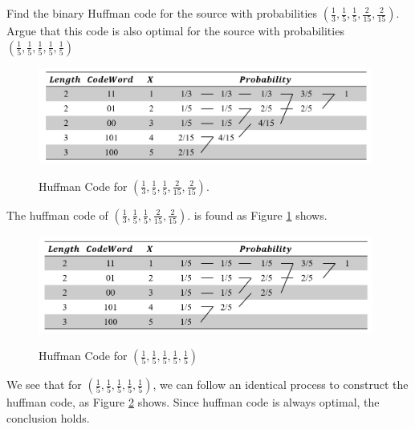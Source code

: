 \begin{exercise}{Find the binary Huffman code for the source with probabilities $\left(\frac{1}{3}, \frac{1}{5}, \frac{1}{5}, \frac{2}{15}, \frac{2}{15}\right) .$ Argue that this code is also optimal for the source with probabilities $\left(\frac{1}{5}, \frac{1}{5}, \frac{1}{5}, \frac{1}{5}, \frac{1}{5}\right)$}
  \begin{solution}
    \begin{figure}[H]
      \caption{Huffman Code for $\left(\frac{1}{3}, \frac{1}{5}, \frac{1}{5}, \frac{2}{15}, \frac{2}{15}\right) .$}
      \centering
      \includegraphics[width=11cm]{img/5-1.png}
      \label{fig:ex4}
    \end{figure}
    The huffman code of  $\left(\frac{1}{3}, \frac{1}{5}, \frac{1}{5}, \frac{2}{15}, \frac{2}{15}\right) .$ is found as Figure \ref{fig:ex4} shows. 

      \begin{figure}[H]
        \caption{Huffman Code for $\left(\frac{1}{5}, \frac{1}{5}, \frac{1}{5}, \frac{1}{5}, \frac{1}{5}\right)$}
        \centering
        \includegraphics[width=11cm]{img/5-2.png}
        \label{fig:ex5}
      \end{figure}
    We see that for $\left(\frac{1}{5}, \frac{1}{5}, \frac{1}{5}, \frac{1}{5}, \frac{1}{5}\right)$, we can follow an identical process to construct the huffman code, as Figure \ref{fig:ex5} shows. Since huffman code is always optimal, the conclusion holds.
  \end{solution}
  \label{ex4}
\end{exercise}


